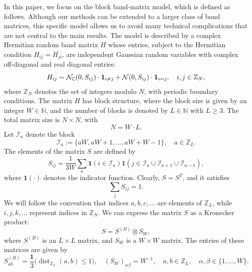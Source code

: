 \documentclass[10pt,reqno]{article}
\theoremstyle{plain} %
\theoremstyle{remark}
\numberwithin{equation}{section}
\begin{document}
 
 
 In this paper, we focus on the block band-matrix model, which is defined as follows. Although our methods can be extended to a larger class of band matrices, this specific model allows us to avoid many technical complications that are not central to the main results.
The model is described by a complex Hermitian random band matrix $H$ whose entries, subject to the Hermitian condition $H_{ij}=\overline{H_{ji}}$, are independent Gaussian random variables with complex off-diagonal and real diagonal entries:
\[
H_{ij} \sim  
    \mathcal{N}_{\mathbb C}(0, S_{ij})\cdot {\bf{1}}_{i\ne j}
    +\mathcal{N}(0, S_{ij})\cdot  {\bf{1}}_{i= j}  , \quad  i,j \in \mathbb{Z}_N,
\]
where \( \mathbb{Z}_N \) denotes the set of integers modulo \( N \), with periodic boundary conditions.  
The matrix \( H \) has block structure, where the block size is given by an integer \( W \in \mathbb{N} \), and the number of blocks is denoted by \( L \in \mathbb{N} \) with \( L\ge 3 \). The total matrix size is \( N \times N \), with
\[
N = W \cdot L.
\]
Let \( \mathcal{I}_a \) denote the block
\[
\mathcal{I}_a := \{aW,aW+1,\ldots,aW+W-1\}, \quad a\in\mathbb Z_L.
\]
The elements of the matrix \( S \) are defined by
\[
S_{ij} = \frac{1}{3W} \sum_a \mathbf{1}(i \in \mathcal{I}_a) \mathbf{1}(j \in \mathcal{I}_a \cup \mathcal{I}_{a+1} \cup \mathcal{I}_{a-1}),
\]
where \( \mathbf{1}(\cdot) \) denotes the indicator function. Clearly, \( S = S^T \), and it satisfies
\[
\sum_j S_{ij} = 1.
\]
We will follow the convention that indices \( a, b, c, \dots \) are elements of \( \mathbb{Z}_L \), while \( i, j, k, \dots \) represent indices in \( \mathbb{Z}_N \). We can express the matrix \( S \) as a Kronecker product:
\[
S = S^{(B)} \otimes S_W,
\]
where \( S^{(B)} \) is an \( L \times L \) matrix, and \( S_W \) is a \( W \times W \) matrix. The entries of these matrices are given by
\[
S^{(B)}_{ab} = \frac{\mathbf{1}}{3}\bigl(\operatorname{dist}_{\mathbb{Z}_L}(a,b) \le 1\bigr), \quad (S_W)_{\alpha\beta} = W^{-1}, \quad a, b \in \mathbb{Z}_L, \quad \alpha,\beta \in \{1, \dots, W\}.
\]

 
\end{document}
